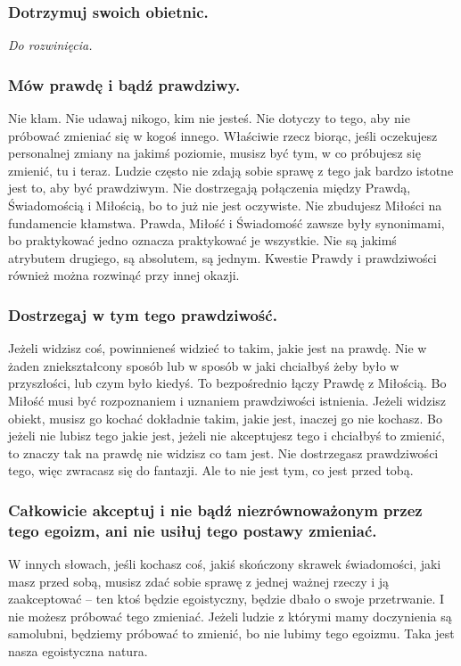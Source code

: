 \documentclass[../dotknieci-miloscia.tex]{subfiles}
\begin{document}
\subsubsection{Dotrzymuj swoich obietnic.}
\emph{Do rozwinięcia.}

\subsubsection{Mów prawdę i bądź prawdziwy.}
Nie kłam. 
Nie udawaj nikogo, kim nie jesteś. 
Nie dotyczy to tego, aby nie próbować zmieniać się w kogoś innego.
Właściwie rzecz biorąc, jeśli oczekujesz personalnej zmiany na jakimś poziomie, 
musisz być tym, w co próbujesz się zmienić, tu i teraz.
Ludzie często nie zdają sobie sprawę z tego jak bardzo istotne jest to, aby być prawdziwym. 
Nie dostrzegają połączenia między Prawdą, Świadomością i Miłością, bo to już nie jest oczywiste. 
Nie zbudujesz Miłości na fundamencie kłamstwa. 
Prawda, Miłość i Świadomość zawsze były synonimami, 
bo praktykować jedno oznacza praktykować je wszystkie. 
Nie są jakimś atrybutem drugiego, są absolutem, są jednym. 
Kwestie Prawdy i prawdziwości również można rozwinąć przy innej okazji. 

\subsubsection{Dostrzegaj w tym tego prawdziwość.}
Jeżeli widzisz coś, powinnieneś widzieć to takim, jakie jest na prawdę. 
Nie w żaden zniekształcony sposób
lub w sposób w jaki chciałbyś żeby było w przyszłości, 
lub czym było kiedyś. 
To bezpośrednio łączy Prawdę z Miłością. 
Bo Miłość musi być rozpoznaniem i uznaniem prawdziwości istnienia. 
Jeżeli widzisz obiekt, musisz go kochać dokładnie takim, jakie jest, 
inaczej go nie kochasz. 
Bo jeżeli nie lubisz tego jakie jest, 
jeżeli nie akceptujesz tego i chciałbyś to zmienić, 
to znaczy tak na prawdę nie widzisz co tam jest. 
Nie dostrzegasz prawdziwości tego, więc zwracasz się do fantazji. 
Ale to nie jest tym, co jest przed tobą.

\subsubsection{Całkowicie akceptuj i nie bądź niezrównoważonym przez tego egoizm, ani nie usiłuj tego postawy zmieniać.}
W innych słowach, jeśli kochasz coś, 
jakiś skończony skrawek świadomości, jaki masz przed sobą, 
musisz zdać sobie sprawę z jednej ważnej rzeczy i ją zaakceptować
-- ten ktoś będzie egoistyczny, będzie dbało o swoje przetrwanie.
I nie możesz próbować tego zmieniać. 
Jeżeli ludzie z którymi mamy doczynienia są samolubni, 
będziemy próbować to zmienić, bo nie lubimy tego egoizmu. 
Taka jest nasza egoistyczna natura.
\end{document}
